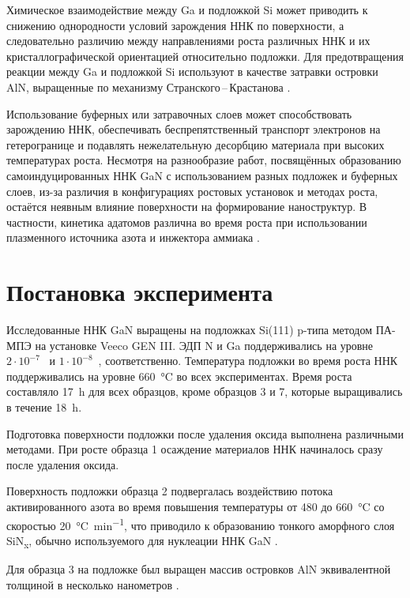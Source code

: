 Химическое взаимодействие между Ga и подложкой Si может приводить к снижению
однородности условий зарождения ННК по поверхности, а следовательно различию
между направлениями роста различных ННК и их кристаллографической ориентацией
относительно подложки. Для предотвращения реакции между Ga и подложкой Si
используют в качестве затравки островки AlN, выращенные по механизму
Странского\,--\,Крастанова \cite{Songmuang2007}.

Использование буферных или затравочных слоев может способствовать зарождению
ННК, обеспечивать беспрепятственный транспорт электронов на гетерогранице и
подавлять нежелательную десорбцию материала при высоких температурах роста.
Несмотря на разнообразие работ, посвящённых образованию самоиндуцированных ННК
GaN с использованием разных подложек и буферных слоев, из-за различия в
конфигурациях ростовых установок и методах роста, остаётся неявным влияние
поверхности на формирование наноструктур. В частности, кинетика адатомов
различна во время роста при использовании плазменного источника азота и
инжектора аммиака \cite{Kawaharazuka2010}.

\section{Постановка эксперимента}\label{sec:ch4/sec1}

Исследованные ННК GaN выращены на подложках Si(111) p-типа методом ПА-МПЭ на
установке Veeco GEN III. ЭДП N и Ga поддерживались на уровне \(2 \cdot
10^{-7}\)~\si{\torr} и \(1 \cdot 10^{-8}\)~\si{\torr}, соответственно.
Температура подложки во время роста ННК поддерживались на уровне
660~\si{\degreeCelsius} во всех экспериментах. Время роста составляло
17~\si{\hour} для всех образцов, кроме образцов 3 и 7, которые выращивались в
течение 18~\si{\hour}.

Подготовка поверхности подложки после удаления оксида выполнена различными
методами. При росте образца 1 осаждение материалов ННК начиналось сразу после
удаления оксида.

Поверхность подложки образца 2 подвергалась воздействию потока активированного
азота во время повышения температуры от 480 до 660~\si{\degreeCelsius} со
скоростью 20~\si{\degreeCelsius\per\minute}, что приводило к образованию
тонкого аморфного слоя SiN\textsubscript{x}, обычно используемого для нуклеации
ННК GaN \cite{Wierzbicka2013}.

Для образца 3 на подложке был выращен массив островков AlN эквивалентной
толщиной в несколько нанометров \cite{Bolshakov2018}.

